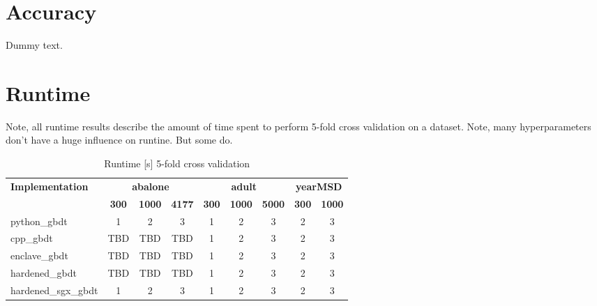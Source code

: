 \section{Accuracy}

Dummy text.

\section{Runtime}

Note, all runtime results describe the amount of time spent to perform 5-fold cross validation on a dataset.
Note, many hyperparameters don't have a huge influence on runtine. But some do.


\begin{table}
    \centering
    \renewcommand{\arraystretch}{1.2}
    \begin{tabular}{|p{3.2cm}|c|c|c|c|c|c|c|c|}
      \hline
      \multirow{2}{3.2cm}{\textbf{Implementation}} & \multicolumn{3}{c|}{\textbf{abalone}} & \multicolumn{3}{c|}{\textbf{adult}} & \multicolumn{2}{c|}{\textbf{yearMSD}}\\
      \cline{2-9}
      & \textbf{300} & \textbf{1000} & \textbf{4177} & \textbf{300} & \textbf{1000} & \textbf{5000} & \textbf{300} & \textbf{1000}\\
      \hline
      python\_gbdt & 1 & 2 & 3 & 1 & 2 & 3 & 2 & 3 \\ \hline
      cpp\_gbdt & TBD & TBD & TBD & 1 & 2 & 3 & 2 & 3 \\ \hline
      enclave\_gbdt & TBD & TBD & TBD & 1 & 2 & 3 & 2 & 3 \\ \hline
      hardened\_gbdt & TBD & TBD & TBD & 1 & 2 & 3 & 2 & 3 \\ \hline
      hardened\_sgx\_gbdt & 1 & 2 & 3 & 1 & 2 & 3 & 2 & 3 \\ \hline
    \end{tabular}
    \caption{Runtime [s] 5-fold cross validation}
  \end{table}
